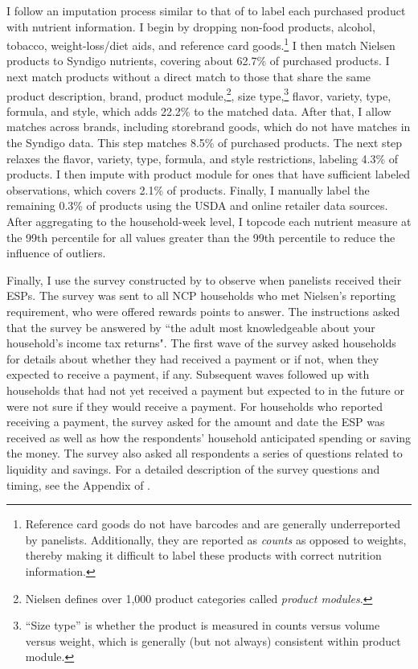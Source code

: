 \documentclass[12pt]{article}
\begin{document}
I follow an imputation process similar to that of \textcite{dubois2014prices} to label each purchased product with nutrient information.
I begin by dropping non-food products, alcohol, tobacco, weight-loss/diet aids, and reference card goods.\footnote{Reference card goods do not have barcodes and are generally underreported by panelists.
Additionally, they are reported as \textit{counts} as opposed to weights, thereby making it difficult to label these products with correct nutrition information.} %
I then match Nielsen products to Syndigo nutrients, covering about 62.7\% of purchased products.
I next match products without a direct match to those that share the same product description, brand, product module,\footnote{Nielsen defines over 1,000 product categories called \textit{product modules}.}, size type,\footnote{``Size type'' is whether the product is measured in counts versus volume versus weight, which is generally (but not always) consistent within product module.} flavor, variety, type, formula, and style, which adds 22.2\% to the matched data.
After that, I allow matches across brands, including storebrand goods, which do not have matches in the Syndigo data.
This step matches 8.5\% of purchased products.
The next step relaxes the flavor, variety, type, formula, and style restrictions, labeling 4.3\% of products.
I then impute with product module for ones that have sufficient labeled observations, which covers 2.1\% of products.
Finally, I manually label the remaining 0.3\% of products using the USDA and online retailer data sources.
After aggregating to the household-week level, I topcode each nutrient measure at the 99th percentile for all values greater than the 99th percentile to reduce the influence of outliers.

Finally, I use the survey constructed by \textcite{broda2014economic} to observe when panelists received their ESPs.
The survey was sent to all NCP households who met Nielsen's reporting requirement, who were offered rewards points to answer.
The instructions asked that the survey be answered by ``the adult most knowledgeable about your household's income tax returns".
The first wave of the survey asked households for details about whether they had received a payment or if not, when they expected to receive a payment, if any.
Subsequent waves followed up with households that had not yet received a payment but expected to in the future or were not sure if they would receive a payment.
For households who reported receiving a payment, the survey asked for the amount and date the ESP was received as well as how the respondents' household anticipated spending or saving the money.
The survey also asked all respondents a series of questions related to liquidity and savings.
For a detailed description of the survey questions and timing, see the Appendix of \textcite{broda2014economic}.
\end{document}
